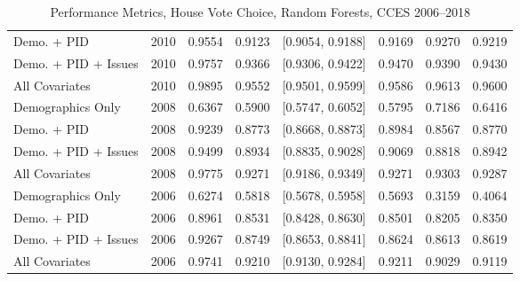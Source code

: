 \begin{table}[ht]
\begin{tabular}{lrrrlrrr}
  Demo. + PID & 2010 & 0.9554 & 0.9123 & [0.9054, 0.9188] & 0.9169 & 0.9270 & 0.9219 \\ 
  Demo. + PID + Issues & 2010 & 0.9757 & 0.9366 & [0.9306, 0.9422] & 0.9470 & 0.9390 & 0.9430 \\ 
  All Covariates & 2010 & 0.9895 & 0.9552 & [0.9501, 0.9599] & 0.9586 & 0.9613 & 0.9600 \\ 
  Demographics Only & 2008 & 0.6367 & 0.5900 & [0.5747, 0.6052] & 0.5795 & 0.7186 & 0.6416 \\ 
  Demo. + PID & 2008 & 0.9239 & 0.8773 & [0.8668, 0.8873] & 0.8984 & 0.8567 & 0.8770 \\ 
  Demo. + PID + Issues & 2008 & 0.9499 & 0.8934 & [0.8835, 0.9028] & 0.9069 & 0.8818 & 0.8942 \\ 
  All Covariates & 2008 & 0.9775 & 0.9271 & [0.9186, 0.9349] & 0.9271 & 0.9303 & 0.9287 \\ 
  Demographics Only & 2006 & 0.6274 & 0.5818 & [0.5678, 0.5958] & 0.5693 & 0.3159 & 0.4064 \\ 
  Demo. + PID & 2006 & 0.8961 & 0.8531 & [0.8428, 0.8630] & 0.8501 & 0.8205 & 0.8350 \\ 
  Demo. + PID + Issues & 2006 & 0.9267 & 0.8749 & [0.8653, 0.8841] & 0.8624 & 0.8613 & 0.8619 \\ 
  All Covariates & 2006 & 0.9741 & 0.9210 & [0.9130, 0.9284] & 0.9211 & 0.9029 & 0.9119 \\ 
   \bottomrule
\end{tabular}
\caption{Performance Metrics, House Vote Choice, Random Forests, CCES 2006--2018} 
\label{tab:cces_house_rf}
\end{table}
